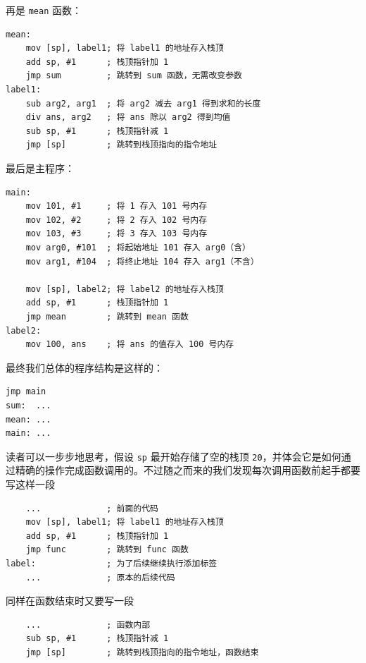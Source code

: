 再是 \texttt{mean} 函数：
\begin{verbatim}
mean:
    mov [sp], label1; 将 label1 的地址存入栈顶
    add sp, #1      ; 栈顶指针加 1
    jmp sum         ; 跳转到 sum 函数，无需改变参数
label1:
    sub arg2, arg1  ; 将 arg2 减去 arg1 得到求和的长度
    div ans, arg2   ; 将 ans 除以 arg2 得到均值
    sub sp, #1      ; 栈顶指针减 1
    jmp [sp]        ; 跳转到栈顶指向的指令地址
\end{verbatim}

最后是主程序：
\begin{verbatim}
main:
    mov 101, #1     ; 将 1 存入 101 号内存
    mov 102, #2     ; 将 2 存入 102 号内存
    mov 103, #3     ; 将 3 存入 103 号内存
    mov arg0, #101  ; 将起始地址 101 存入 arg0（含）
    mov arg1, #104  ; 将终止地址 104 存入 arg1（不含）

    mov [sp], label2; 将 label2 的地址存入栈顶
    add sp, #1      ; 栈顶指针加 1
    jmp mean        ; 跳转到 mean 函数
label2:
    mov 100, ans    ; 将 ans 的值存入 100 号内存
\end{verbatim}

最终我们总体的程序结构是这样的：
\begin{verbatim}
jmp main
sum:  ...
mean: ...
main: ...
\end{verbatim}

读者可以一步步地思考，假设 \texttt{sp} 最开始存储了空的栈顶 \texttt{20}，并体会它是如何通过精确的操作完成函数调用的。不过随之而来的我们发现每次调用函数前起手都要写这样一段
\begin{verbatim}
    ...             ; 前面的代码
    mov [sp], label1; 将 label1 的地址存入栈顶
    add sp, #1      ; 栈顶指针加 1
    jmp func        ; 跳转到 func 函数
label:              ; 为了后续继续执行添加标签
    ...             ; 原本的后续代码
\end{verbatim}

同样在函数结束时又要写一段
\begin{verbatim}
    ...             ; 函数内部
    sub sp, #1      ; 栈顶指针减 1
    jmp [sp]        ; 跳转到栈顶指向的指令地址，函数结束
\end{verbatim}

